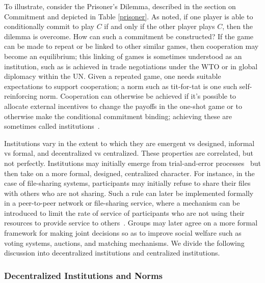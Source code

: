 \documentclass[11pt, a4paper, logo, onecolumn, nonumbering]{deepmind}
\begin{document}
To illustrate, consider the Prisoner's Dilemma, described in the section on Commitment and depicted in Table \ref{prisoner}. As noted, if one player is able to conditionally commit to play $C$ if and only if the other player plays $C$, then the dilemma is overcome. How can such a commitment be constructed? If the game can be made to repeat or be linked to other similar games, then cooperation may become an equilibrium; this linking of games is sometimes understood as an institution, such as is achieved in trade negotiations under the WTO or in global diplomacy within the UN.  Given a repeated game, one needs suitable expectations to support cooperation; a norm such as tit-for-tat is one such self-reinforcing norm. Cooperation can otherwise be achieved if it's possible to allocate external incentives to change the payoffs in the one-shot game or to otherwise make the conditional commitment binding; achieving these are sometimes called institutions~\cite{frieden2015world,north1993institutions}. 


Institutions vary in the extent to which they are emergent vs designed, informal vs formal, and decentralized vs centralized. These properties are correlated, but not perfectly. 
Institutions may initially emerge from trial-and-error processes~\cite{ostrom1998behavioral} but then take on a more formal, designed, centralized character. For instance, in the case of file-sharing systems, participants may initially refuse to share their files with others who are not sharing. Such a rule can later be implemented formally in a peer-to-peer network or file-sharing service, where a mechanism can be introduced to limit the rate of service of participants who are not using their resources to provide service to others~\cite{golle2001incentives,lai2003incentives,legout2007clustering}. Groups may later agree on a more formal framework for making joint decisions so as to improve social welfare such as voting systems, auctions, and matching mechanisms.  We divide the following discussion into decentralized institutions and centralized institutions.







\subsubsection{Decentralized Institutions and Norms}
\label{l_sect_inst_decentralized}
\end{document}
